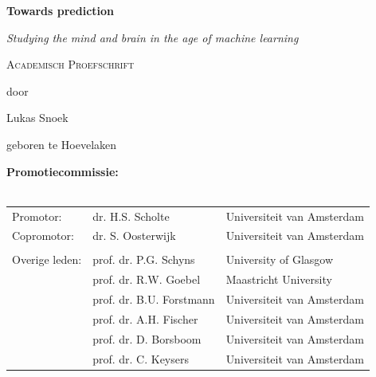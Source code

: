 \documentclass[11pt,american,a4paper,oneside,]{memoir} %
\begin{document}
\clearpage
\thispagestyle{empty}
\vspace*{\drop}
\begin{center}
\Huge\textbf{Towards prediction}\par
\vspace{\baselineskip}
\Large\textit{Studying the mind and brain in the age of machine learning}\par
\vfill %
\large \textsc{Academisch Proefschrift}\par
\vspace{\baselineskip}
\par %
\vspace{\baselineskip}
{\large door}\par
\vspace{\baselineskip}
{\Large Lukas Snoek}\par
\vspace{\baselineskip}
{\large geboren te Hoevelaken}
\end{center}

\clearpage
\thispagestyle{empty}
\noindent\textbf{Promotiecommissie:}\\
\\
\noindent\begin{tabular}{@{}lll}

Promotor:
&  dr. H.S. Scholte & Universiteit van Amsterdam\\

Copromotor:
&  dr. S. Oosterwijk & Universiteit van Amsterdam\\

\\
Overige leden:
&  prof. dr. P.G. Schyns & University of Glasgow\\
&  prof. dr. R.W. Goebel & Maastricht University\\
&  prof. dr. B.U. Forstmann & Universiteit van Amsterdam\\
&  prof. dr. A.H. Fischer & Universiteit van Amsterdam\\
&  prof. dr. D. Borsboom & Universiteit van Amsterdam\\
&  prof. dr. C. Keysers & Universiteit van Amsterdam\\
\end{tabular}\\
\end{document}
